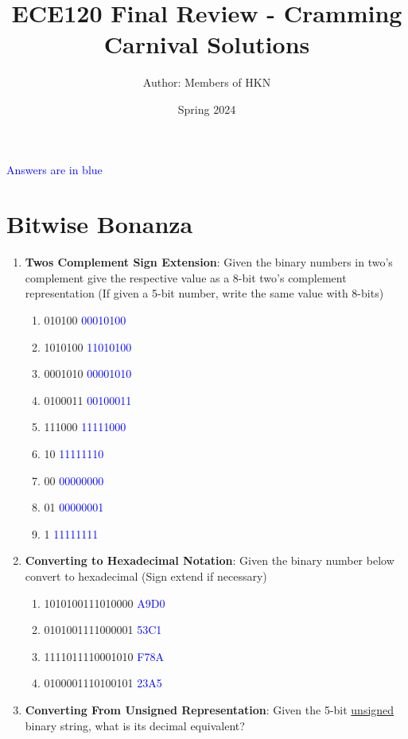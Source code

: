 \documentclass{article}
\title{ECE120 Final Review - Cramming Carnival Solutions}
\author{Author: Members of HKN}
\date{Spring 2024}
\begin{document}
\maketitle

\textcolor{blue}{Answers are in blue}
\section{Bitwise Bonanza}
\begin{enumerate}[label=(\alph*)]
    \item \textbf{Twos Complement Sign Extension}: Given the binary numbers in two’s complement give the respective value as a 8-bit two’s complement representation (If given a 5-bit number, write the same value with 8-bits)
    \begin{enumerate}[label=(\roman*)]
        \item 010100 \textcolor{blue}{00010100}
        \item 1010100 \textcolor{blue}{11010100}
        \item 0001010 \textcolor{blue}{00001010}
        \item 0100011 \textcolor{blue}{00100011}
        \item 111000 \textcolor{blue}{11111000}
        \item 10 \textcolor{blue}{11111110}
        \item 00 \textcolor{blue}{00000000}
        \item 01 \textcolor{blue}{00000001}
        \item 1 \textcolor{blue}{11111111}
    \end{enumerate}
    \item \textbf{Converting to Hexadecimal Notation}: Given the binary number below convert to hexadecimal (Sign extend if necessary)
    \begin{enumerate}[label=(\roman*)]
        \item 1010100111010000 \textcolor{blue}{A9D0}
        \item 0101001111000001 \textcolor{blue}{53C1}
        \item 1111011110001010 \textcolor{blue}{F78A}
        \item 0100001110100101 \textcolor{blue}{23A5}
    \end{enumerate}
    \item \textbf{Converting From Unsigned Representation}: Given the 5-bit \underline{unsigned} binary string, what is its decimal equivalent?
    \begin{enumerate}[label=(\roman*)]

\end{enumerate}
\end{enumerate}
\end{document}
